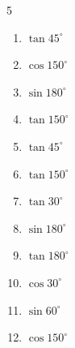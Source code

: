\begin{multicols}{5}
\begin{enumerate}

  \item $\displaystyle \tan{45^\circ}$

        \phantom{$\displaystyle =1$}

  \item $\displaystyle \cos{150^\circ}$


\columnbreak %

  \item $\displaystyle \sin{180^\circ}$

        \phantom{$\displaystyle =0$}

  \item $\displaystyle \tan{150^\circ}$


  \item $\displaystyle \tan{45^\circ}$

        \phantom{$\displaystyle =1$}

  \item $\displaystyle \tan{150^\circ}$


  \item $\displaystyle \tan{30^\circ}$


  \item $\displaystyle \sin{180^\circ}$

        \phantom{$\displaystyle =0$}

  \item $\displaystyle \tan{180^\circ}$

        \phantom{$\displaystyle =0$}

  \item $\displaystyle \cos{30^\circ}$


  \item $\displaystyle \sin{60^\circ}$


  \item $\displaystyle \cos{150^\circ}$



\end{enumerate}
\end{multicols}
